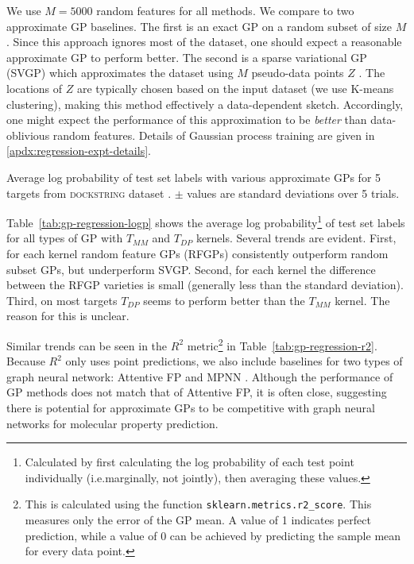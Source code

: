 We use $M=5000$ random features for all methods.
We compare to two approximate GP baselines.
The first is an exact GP on a random subset of size $M$.
Since this approach ignores most of the dataset,
one should expect a reasonable approximate GP to perform better.
The second is a sparse variational GP (SVGP) which approximates the dataset using $M$ pseudo-data points $Z$
\citep{titsias2009variational,hensman2013gaussian}.
The locations of $Z$ are typically chosen based on the input dataset (we use K-means clustering),
making this method effectively a data-dependent sketch.
Accordingly, one might expect the performance of this approximation to be \emph{better}
than data-oblivious random features.
Details of Gaussian process training are given in \cref{apdx:regression-expt-details}.

\begin{table}[tb]
\caption[Average log probabilities of dockstring test set labels with various approximate GPs.]{
Average log probability of test set labels with various approximate GPs
for 5 targets from \textsc{dockstring} dataset \citep{ortegon2021dockstring}.
$\pm$ values are standard deviations over 5 trials.
}
\label{tab:gp-regression-logp}
\begin{center}
\resizebox{0.95\textwidth}{!}{
\begin{sc}

\end{sc}
}
\end{center}
\end{table}

Table~\ref{tab:gp-regression-logp} shows the average log probability\footnote{
    Calculated by first calculating the log probability of each test point individually
    (i.e.\@ marginally, not jointly), then averaging these values.
}
of test set labels
for all types of GP with $T_{MM}$ and $T_{DP}$ kernels.
Several trends are evident.
First, for each kernel random feature GPs (RFGPs) consistently outperform random subset GPs,
but underperform SVGP.
Second, for each kernel the difference between the RFGP varieties is small
(generally less than the standard deviation).
Third, on most targets $T_{DP}$ seems to perform better than the $T_{MM}$ kernel.
The reason for this is unclear.

Similar trends can be seen in the $R^2$ metric\footnote{
    This is calculated using the function \texttt{sklearn.metrics.r2\_score}.
    This measures only the error of the GP mean.
    A value of 1 indicates perfect prediction,
    while a value of 0 can be achieved by predicting the sample mean for every data point.
}
in Table~\ref{tab:gp-regression-r2}.
Because $R^2$ only uses point predictions,
we also include baselines for two types of graph neural network:
Attentive FP \citep{xiong2019pushing}
and MPNN \citep{gilmer2017neural}.
Although the performance of GP methods does not match that of Attentive FP,
it is often close,
suggesting there is potential for approximate GPs to be competitive with graph neural networks
for molecular property prediction.

